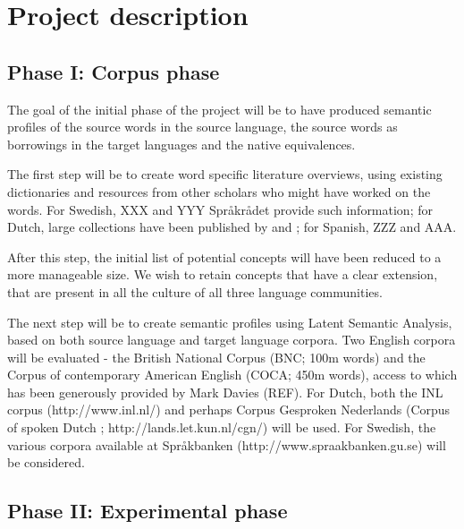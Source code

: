\documentclass[a4paper]{article}
\begin{document}








\section{Project description}



\subsection{Phase I: Corpus phase}
\label{sect_corpus}

The goal of the initial phase of the project will be to have produced semantic profiles of the source words in the source language, the source words as borrowings in the target languages and the native equivalences. 

The first step will be to create word specific literature overviews, using existing dictionaries and resources from other scholars who might have worked on the words. For Swedish, XXX and YYY Spr\aa kr\aa det provide such information; for Dutch, large collections have been published by \cite{Koops2009} and \cite{Braamkolk2005}; for Spanish, ZZZ and AAA.

After this step, the initial list of potential concepts will have been reduced to a more manageable size. We wish to retain concepts that have a clear extension, that are present in all the culture of all three language communities.

The next step will be to create semantic profiles using Latent Semantic Analysis, based on both source language and target language corpora. Two English corpora will be evaluated - the British National Corpus (BNC; 100m words) and the Corpus of contemporary American English (COCA; 450m words), access to which has been generously provided by Mark Davies (REF). For Dutch, both the INL corpus (http://www.inl.nl/) and perhaps Corpus Gesproken Nederlands (Corpus of spoken Dutch ; http://lands.let.kun.nl/cgn/) will be used. For Swedish, the various corpora available at Spr\aa kbanken (http://www.spraakbanken.gu.se) will be considered.



\subsection{Phase II: Experimental phase}
\end{document}
